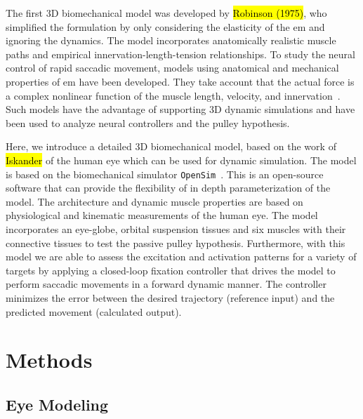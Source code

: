 \documentclass[11pt,a4paper,draft=false]{report}
\begin{document}
The first 3D biomechanical model was developed by \hl{Robinson (1975)}, who
simplified the formulation by only considering the elasticity of the \gls{em}
and ignoring the dynamics. The model incorporates anatomically realistic muscle
paths and empirical innervation-length-tension relationships. To study the
neural control of rapid saccadic movement, models using anatomical and
mechanical properties of \gls{em} have been developed. They take account that
the actual force is a complex nonlinear function of the muscle length, velocity,
and innervation~\cite{Thelen2003, Millard2013}. Such models have the advantage
of supporting 3D dynamic simulations and have been used to analyze neural
controllers and the pulley hypothesis.

Here, we introduce a detailed 3D biomechanical model, based on the work of
\hl{Iskander} of the human eye which can be used for dynamic simulation. The
model is based on the biomechanical simulator
\texttt{OpenSim}~\cite{Delp2007}. This is an open-source software that can
provide the flexibility of in depth parameterization of the model. The
architecture and dynamic muscle properties are based on physiological and
kinematic measurements of the human eye. The model incorporates an eye-globe,
orbital suspension tissues and six muscles with their connective tissues to test
the passive pulley hypothesis. Furthermore, with this model we are able to
assess the excitation and activation patterns for a variety of targets by
applying a closed-loop fixation controller that drives the model to perform
saccadic movements in a forward dynamic manner. The controller minimizes the
error between the desired trajectory (reference input) and the predicted
movement (calculated output).

\section*{Methods}\label{sec:methods}

\subsection*{Eye Modeling}\label{sec:eye-Modeling}
\end{document}

